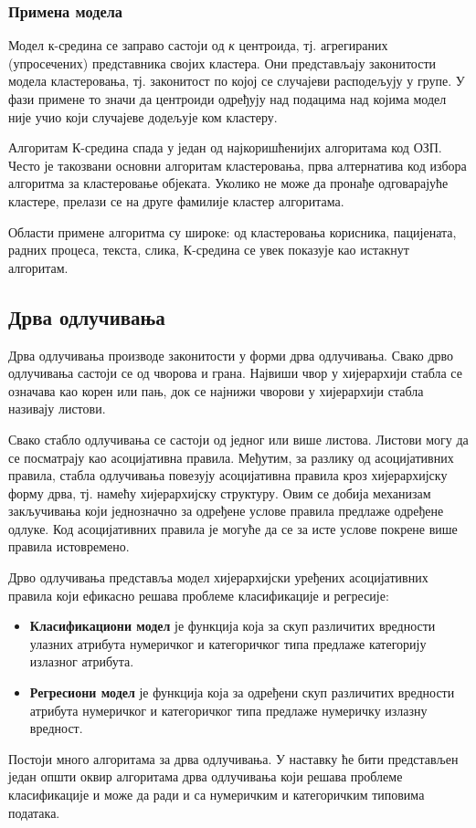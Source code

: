 \subsubsection{Примена модела}
Модел к-средина се заправо састоји од \textit{к} центроида, тј. агрегираних (упросечених) представника својих кластера. Они представљају законитости модела кластеровања, тј. законитост по којој се случајеви расподељују у групе. У фази примене то значи да центроиди одређују над подацима над којима модел није учио који случајеве додељује ком кластеру.

Алгоритам К-средина спада у један од најкоришћенијих алгоритама код ОЗП. Често је такозвани основни алгоритам кластеровања, прва алтернатива код избора алгоритма за кластеровање објеката. Уколико не може да пронађе одговарајуће кластере, прелази се на друге фамилије кластер алгоритама.

Области примене алгоритма су широке: од кластеровања корисника, пацијената, радних процеса, текста, слика, К-средина се увек показује као истакнут алгоритам.

\subsection{Дрва одлучивања}
Дрва одлучивања производе законитости у форми дрва одлучивања. Свако дрво одлучивања састоји се од чворова и грана. Највиши чвор у хијерархији стабла се означава као корен или пањ, док се најнижи чворови у хијерархији стабла називају листови.

Свако стабло одлучивања се састоји од једног или више листова. Листови могу да се посматрају као асоцијативна правила. Међутим, за разлику од асоцијативних правила, стабла одлучивања повезују асоцијативна правила кроз хијерархијску форму дрва, тј. намећу хијерархијску структуру. Овим се добија механизам закључивања који једнозначно за одређене услове правила предлаже одређене одлуке. Код асоцијативних правила је могуће да се за исте услове покрене више правила истовремено.

Дрво одлучивања представља модел хијерархијски уређених асоцијативних правила који ефикасно решава проблеме класификације и регресије:

\begin{itemize}
  \item \textbf{Класификациони модел} је функција која за скуп различитих вредности улазних атрибута нумеричког и категоричког типа предлаже категорију излазног атрибута.
  \item \textbf{Регресиони модел} је функција која за одређени скуп различитих вредности атрибута нумеричког и категоричког типа предлаже нумеричку излазну вредност.
\end{itemize}
Постоји много алгоритама за дрва одлучивања. У наставку ће бити представљен један општи оквир алгоритама дрва одлучивања који решава проблеме класификације и може да ради и са нумеричким и категоричким типовима података.

